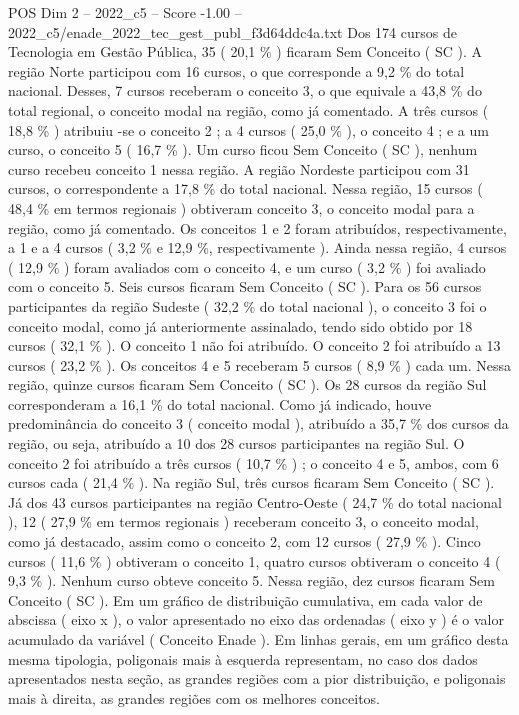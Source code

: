 \begin{textsample}{POS Dim 2 – 2022\_c5 – Score -1.00 – 2022\_c5/enade\_2022\_tec\_gest\_publ\_f3d64ddc4a.txt}
Dos 174 cursos de Tecnologia em Gestão Pública, 35 ( 20,1 \% ) ficaram Sem Conceito ( SC ).
A região Norte participou com 16 cursos, o que corresponde a 9,2 \% do total nacional.
Desses, 7 cursos receberam o conceito 3, o que equivale a 43,8 \% do total regional, o conceito modal na região, como já comentado.
A três cursos ( 18,8 \% ) atribuiu -se o conceito 2 ; a 4 cursos ( 25,0 \% ), o conceito 4 ; e a um curso, o conceito 5 ( 16,7 \% ).
Um curso ficou Sem Conceito ( SC ), nenhum curso recebeu conceito 1 nessa região.
A região Nordeste participou com 31 cursos, o correspondente a 17,8 \% do total nacional.
Nessa região, 15 cursos ( 48,4 \% em termos regionais ) obtiveram conceito 3, o conceito modal para a região, como já comentado.
Os conceitos 1 e 2 foram atribuídos, respectivamente, a 1 e a 4 cursos ( 3,2 \% e 12,9 \%, respectivamente ).
Ainda nessa região, 4 cursos ( 12,9 \% ) foram avaliados com o conceito 4, e um curso ( 3,2 \% ) foi avaliado com o conceito 5.
Seis cursos ficaram Sem Conceito ( SC ).
Para os 56 cursos participantes da região Sudeste ( 32,2 \% do total nacional ), o conceito 3 foi o conceito modal, como já anteriormente assinalado, tendo sido obtido por 18 cursos ( 32,1 \% ).
O conceito 1 não foi atribuído.
O conceito 2 foi atribuído a 13 cursos ( 23,2 \% ).
Os conceitos 4 e 5 receberam 5 cursos ( 8,9 \% ) cada um.
Nessa região, quinze cursos ficaram Sem Conceito ( SC ).
Os 28 cursos da região Sul corresponderam a 16,1 \% do total nacional.
Como já indicado, houve predominância do conceito 3 ( conceito modal ), atribuído a 35,7 \% dos cursos da região, ou seja, atribuído a 10 dos 28 cursos participantes na região Sul.
O conceito 2 foi atribuído a três cursos ( 10,7 \% ) ; o conceito 4 e 5, ambos, com 6 cursos cada ( 21,4 \% ).
Na região Sul, três cursos ficaram Sem Conceito ( SC ).
Já dos 43 cursos participantes na região Centro-Oeste ( 24,7 \% do total nacional ), 12 ( 27,9 \% em termos regionais ) receberam conceito 3, o conceito modal, como já destacado, assim como o conceito 2, com 12 cursos ( 27,9 \% ).
Cinco cursos ( 11,6 \% ) obtiveram o conceito 1, quatro cursos obtiveram o conceito 4 ( 9,3 \% ).
Nenhum curso obteve conceito 5.
Nessa região, dez cursos ficaram Sem Conceito ( SC ).
Em um gráfico de distribuição cumulativa, em cada valor de abscissa ( eixo x ), o valor apresentado no eixo das ordenadas ( eixo y ) é o valor acumulado da variável ( Conceito Enade ).
Em linhas gerais, em um gráfico desta mesma tipologia, poligonais mais à esquerda representam, no caso dos dados apresentados nesta seção, as grandes regiões com a pior distribuição, e poligonais mais à direita, as grandes regiões com os melhores conceitos.

\end{textsample}
